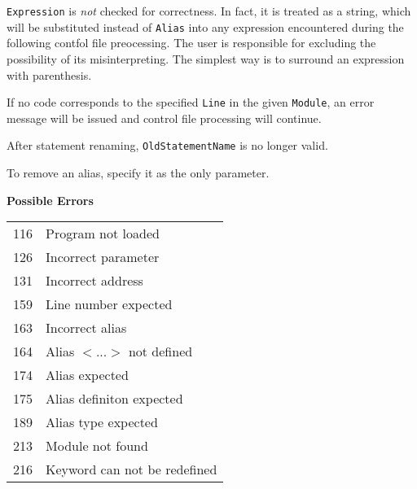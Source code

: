 \verb'Expression' is {\em not} checked for correctness. In fact, it is treated
as a string, which will be substituted instead of \verb'Alias' into any
expression encountered during the following contfol file preocessing.
The user is responsible for excluding the possibility of its misinterpreting.
The simplest way is to surround an expression with parenthesis.

If no code corresponds to the specified \verb'Line' in the given \verb'Module',
an error message will be issued and control file processing will continue.

After statement renaming, \verb'OldStatementName' is no longer valid.

To remove an alias, specify it as the only parameter.

{\samepage
{\bf Possible Errors}
\begin{flushleft}
\begin{tabular}{ll}
116 & Program not loaded \\
126 & Incorrect parameter \\
131 & Incorrect address \\
159 & Line number expected \\
163 & Incorrect alias \\
164 & Alias $<$...$>$ not defined \\
174 & Alias expected \\
175 & Alias definiton expected \\
189 & Alias type expected \\
213 & Module not found \\
216 & Keyword can not be redefined
\end{tabular}
\end{flushleft}
} %
{} %
\fi


